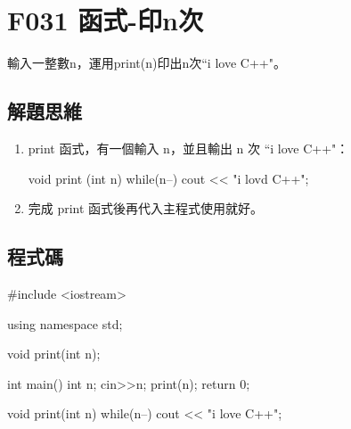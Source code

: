 \section{F031 函式-印n次}
輸入一整數n，運用print(n)印出n次``i love C++"。
\subsection{解題思維}

\begin{enumerate}
	\item
	print 函式，有一個輸入 n，並且輸出 n 次 ``i love C++"：
	\begin{inside}
	void print (int n) {
		while(n--) cout << "i lovd C++\n";	
	}
	\end{inside}
	\item
	完成 print 函式後再代入主程式使用就好。
\end{enumerate} 

\subsection{程式碼}
\begin{cppcode}
	#include <iostream>

	using namespace std;
	
	void print(int n);
	
	int main()
	{
		int n;
		cin>>n;
		print(n);
		return 0;
	}
	
	void print(int n) {
		while(n--) cout << "i love C++\n";
	}
\end{cppcode}
